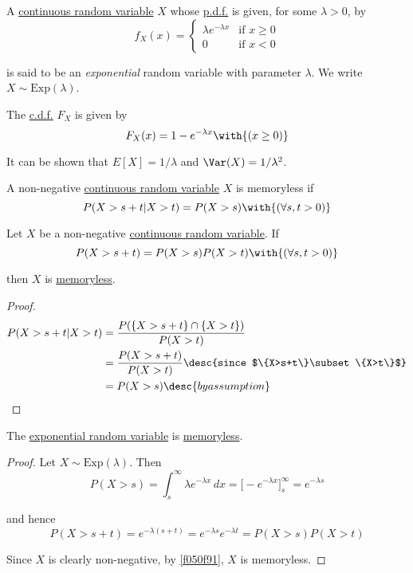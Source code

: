 \label{cad638e}

A \href{bdb1e15}{continuous random variable} $X$ whose \href{cb9d3f0}{p.d.f.}
is given, for some $\lambda>0$, by
$$
  f_X(x)=\begin{cases}
    \lambda e^{-\lambda x} & \text{if }x\geq0 \\
    0                      & \text{if }x<0
  \end{cases}
$$

is said to be an \textit{exponential} random variable with parameter $\lambda$.
We write $X\sim\mathrm{Exp}(\lambda)$.

The \href{ad1290d}{c.d.f.} $F_X$ is given by
$$
  F_X(x)=1-e^{-\lambda x}\with{(x\geq0)}
$$

It can be shown that $E[X]=1/\lambda$ and $\Var(X)=1/\lambda^2$.

\label{b367a24}

A non-negative \href{bdb1e15}{continuous random variable} $X$ is memoryless if
$$
  P(X>s+t|X>t)=P(X>s)\with{(\forall s,t>0)}
$$

\label{f050f91}

Let $X$ be a non-negative \href{bdb1e15}{continuous random variable}. If
$$
  P(X>s+t)=P(X>s)P(X>t)\with{(\forall s,t>0)}
$$

then $X$ is \href{b367a24}{memoryless}.

\begin{proof}
  \begin{align*}
    P(X>s+t|X>t) &=\frac{P(\{X>s+t\}\cap\{X>t\})}{P(X>t)}                        \\
                 &=\frac{P(X>s+t)}{P(X>t)}\desc{since $\{X>s+t\}\subset\{X>t\}$} \\
                 &=P(X>s)\desc{by assumption}
  \end{align*}
\end{proof}

\label{d666af3}

The \href{cad638e}{exponential random variable} is \href{b367a24}{memoryless}.

\begin{proof}
  Let $X\sim\mathrm{Exp}(\lambda)$. Then
  $$
    P(X>s)=\int_s^\infty\lambda e^{-\lambda x}\,dx=\bigl[-e^{-\lambda x}\bigr]_s^\infty=e^{-\lambda s}
  $$

  and hence
  $$
    P(X>s+t)=e^{-\lambda(s+t)}=e^{-\lambda s}e^{-\lambda t}=P(X>s)P(X>t)
  $$

  Since $X$ is clearly non-negative, by \autoref{f050f91}, $X$ is memoryless.
\end{proof}

